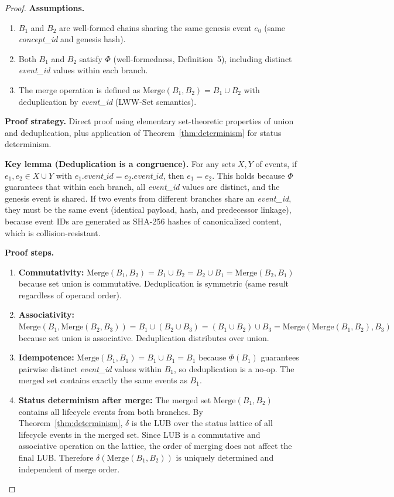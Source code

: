 \begin{proof}
\textbf{Assumptions.}
\begin{enumerate}[label=(A\arabic*),leftmargin=2em]
    \item $B_1$ and $B_2$ are well-formed chains sharing the same genesis event $e_0$ (same \textit{concept\_id} and genesis hash).
    \item Both $B_1$ and $B_2$ satisfy $\Phi$ (well-formedness, Definition~5), including distinct \textit{event\_id} values within each branch.
    \item The merge operation is defined as $\text{Merge}(B_1, B_2) = B_1 \cup B_2$ with deduplication by \textit{event\_id} (LWW-Set semantics).
\end{enumerate}

\textbf{Proof strategy.} Direct proof using elementary set-theoretic properties of union and deduplication, plus application of Theorem~\ref{thm:determinism} for status determinism.

\textbf{Key lemma (Deduplication is a congruence).} For any sets $X, Y$ of events, if $e_1, e_2 \in X \cup Y$ with $e_1.\textit{event\_id} = e_2.\textit{event\_id}$, then $e_1 = e_2$. This holds because $\Phi$ guarantees that within each branch, all \textit{event\_id} values are distinct, and the genesis event is shared. If two events from different branches share an \textit{event\_id}, they must be the same event (identical payload, hash, and predecessor linkage), because event IDs are generated as SHA-256 hashes of canonicalized content, which is collision-resistant.

\textbf{Proof steps.}
\begin{enumerate}[label=Step~\arabic*:,leftmargin=2em]
    \item \textbf{Commutativity:} $\text{Merge}(B_1, B_2) = B_1 \cup B_2 = B_2 \cup B_1 = \text{Merge}(B_2, B_1)$ because set union is commutative. Deduplication is symmetric (same result regardless of operand order).
    \item \textbf{Associativity:} $\text{Merge}(B_1, \text{Merge}(B_2, B_3)) = B_1 \cup (B_2 \cup B_3) = (B_1 \cup B_2) \cup B_3 = \text{Merge}(\text{Merge}(B_1, B_2), B_3)$ because set union is associative. Deduplication distributes over union.
    \item \textbf{Idempotence:} $\text{Merge}(B_1, B_1) = B_1 \cup B_1 = B_1$ because $\Phi(B_1)$ guarantees pairwise distinct \textit{event\_id} values within $B_1$, so deduplication is a no-op. The merged set contains exactly the same events as $B_1$.
    \item \textbf{Status determinism after merge:} The merged set $\text{Merge}(B_1, B_2)$ contains all lifecycle events from both branches. By Theorem~\ref{thm:determinism}, $\delta$ is the LUB over the status lattice of all lifecycle events in the merged set. Since LUB is a commutative and associative operation on the lattice, the order of merging does not affect the final LUB. Therefore $\delta(\text{Merge}(B_1, B_2))$ is uniquely determined and independent of merge order.
\end{enumerate}


\end{proof}
